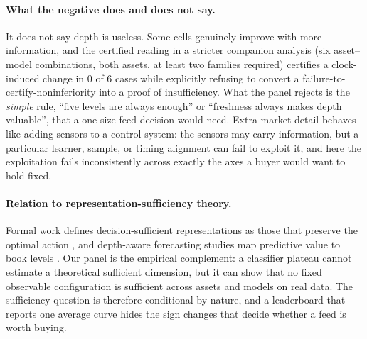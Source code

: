 \paragraph{What the negative does and does not say.} It does not say depth is useless.
Some cells genuinely improve with more information, and the certified reading in a stricter
companion analysis (six asset--model combinations, both assets, at least two families
required) certifies a clock-induced change in $0$ of $6$ cases while explicitly refusing to
convert a failure-to-certify-noninferiority into a proof of insufficiency. What the panel
rejects is the \emph{simple} rule, ``five levels are always enough'' or ``freshness
always makes depth valuable'', that a one-size feed decision would need. Extra market
detail behaves like adding sensors to a control system: the sensors may carry information,
but a particular learner, sample, or timing alignment can fail to exploit it, and here the
exploitation fails inconsistently across exactly the axes a buyer would want to hold fixed.

\paragraph{Relation to representation-sufficiency theory.} Formal work defines
decision-sufficient representations as those that preserve the optimal action
\citep{ye2026learning, walsh2026support}, and depth-aware forecasting studies map
predictive value to book levels \citep{briola2024hlob, briola2024deep}. Our panel is the
empirical complement: a classifier plateau cannot estimate a theoretical sufficient
dimension, but it can show that no fixed observable configuration is sufficient across
assets and models on real data. The sufficiency question is therefore conditional by
nature, and a leaderboard that reports one average curve hides the sign changes that
decide whether a feed is worth buying.
